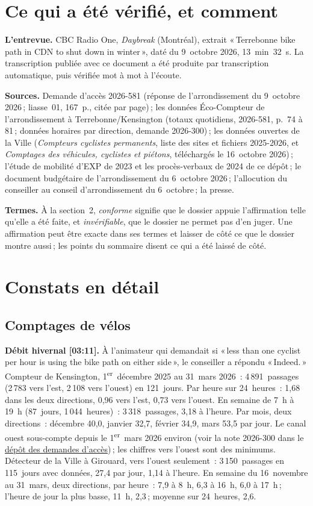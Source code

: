 \documentclass[11pt,letterpaper]{article}
\newcommand{\arurl}{https://github.com/OpenMobilityData/Terrebonne-access-requests}
\newcommand{\cliptime}[1]{\textsf{\small[#1]}}
\begin{document}
\section{Ce qui a été vérifié, et comment}

\textbf{L'entrevue.} CBC Radio One, \emph{Daybreak} (Montréal), extrait
«\,Terrebonne bike path in CDN to shut down in winter\,», daté du
9~octobre 2026, 13~min~32~s. La transcription publiée avec ce document a été
produite par transcription automatique, puis vérifiée mot à mot à
l'écoute.

\textbf{Sources.} Demande d'accès 2026-581 (réponse de l'arrondissement du
9~octobre 2026\,; liasse~01, 167~p., citée par page)\,; les données
Éco-Compteur de l'arrondissement à Terrebonne/Kensington (totaux quotidiens,
2026-581, p.~74 à 81\,; données horaires par direction, demande 2026-300)\,;
les données ouvertes de la Ville (\emph{Compteurs cyclistes permanents},
liste des sites et fichiers 2025-2026, et \emph{Comptages des véhicules,
cyclistes et piétons}, téléchargés le 16~octobre 2026)\,; l'étude de
mobilité d'EXP de 2023 et les procès-verbaux de 2024 de ce dépôt\,; le
document budgétaire de l'arrondissement du 6~octobre 2026\,; l'allocution
du conseiller au conseil d'arrondissement du 6~octobre\,; la presse.

\textbf{Termes.} À la section~2, \emph{conforme} signifie que le dossier
appuie l'affirmation telle qu'elle a été faite, et \emph{invérifiable}, que
le dossier ne permet pas d'en juger. Une affirmation peut être exacte dans
ses termes et laisser de côté ce que le dossier montre aussi\,; les points
du sommaire disent ce qui a été laissé de côté.

\section{Constats en détail}

\subsection{Comptages de vélos}

\textbf{Débit hivernal \cliptime{03:11}.} À l'animateur qui demandait si
«\,less than one cyclist per hour is using the bike path on either side\,»,
le conseiller a répondu «\,Indeed.\,» Compteur de Kensington,
1\textsuperscript{er}~décembre 2025 au 31~mars 2026~: 4\,891~passages
(2\,783 vers l'est, 2\,108 vers l'ouest) en 121~jours. Par heure sur
24~heures~: 1{,}68 dans les deux directions, 0{,}96 vers l'est, 0{,}73 vers
l'ouest. En semaine de 7~h à 19~h (87~jours, 1\,044~heures)~:
3\,318~passages, 3{,}18 à l'heure. Par mois, deux directions~: décembre
40{,}0, janvier 32{,}7, février 34{,}9, mars 53{,}5 par jour. Le canal ouest
sous-compte depuis le 1\textsuperscript{er}~mars 2026 environ (voir la note
2026-300 dans le \href{\arurl}{dépôt des demandes d'accès})\,; les chiffres
vers l'ouest sont des minimums. Détecteur de la Ville à Girouard, vers
l'ouest seulement~: 3\,150~passages en 115~jours avec données, 27{,}4 par
jour, 1{,}14 à l'heure. En semaine du 16~novembre au 31~mars, deux
directions, par heure~: 7{,}9 à 8~h, 6{,}3 à 16~h, 6{,}0 à 17~h\,; l'heure de
jour la plus basse, 11~h, 2{,}3\,; moyenne sur 24~heures, 2{,}6.
\end{document}
